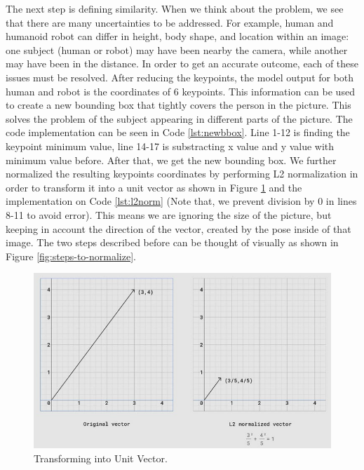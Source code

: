 The next step is defining similarity. When we think about the problem, we see that there are many uncertainties to be addressed. For example, human and humanoid robot can differ in height, body shape, and location within an image: one subject (human or robot) may have been nearby the camera,
while another may have been in the distance. In order to get an accurate outcome, each of these issues must be resolved.
After reducing the keypoints, the model output for both human and robot is the coordinates of 6 keypoints. This information can be used to create a new bounding box that tightly covers the person in the picture. This solves the problem of the subject appearing in different parts of the picture.
The code implementation can be seen in Code \ref{lst:newbbox}. Line 1-12 is finding the keypoint minimum value, line 14-17 is substracting x value and y value with minimum value before. After that, we get the new bounding box.
We further normalized the resulting keypoints coordinates by performing L2 normalization in order to transform it into a unit vector as shown in Figure \ref{fig:transforming-into-unit-vector} and the implementation on Code \ref{lst:l2norm} (Note that, we prevent division by 0 in lines 8-11 to avoid error).
This means we are ignoring the size of the picture, but keeping in account the direction of the vector, created by the pose inside of that image.
The two steps described before can be thought of visually as shown in Figure \ref{fig:steps-to-normalize}.



\begin{figure}[ht]
  \centering
  \includegraphics[scale=0.9]{gambar/transform-to-unit-vector.png}
  \caption{Transforming into Unit Vector.}
  \label{fig:transforming-into-unit-vector}
\end{figure}

